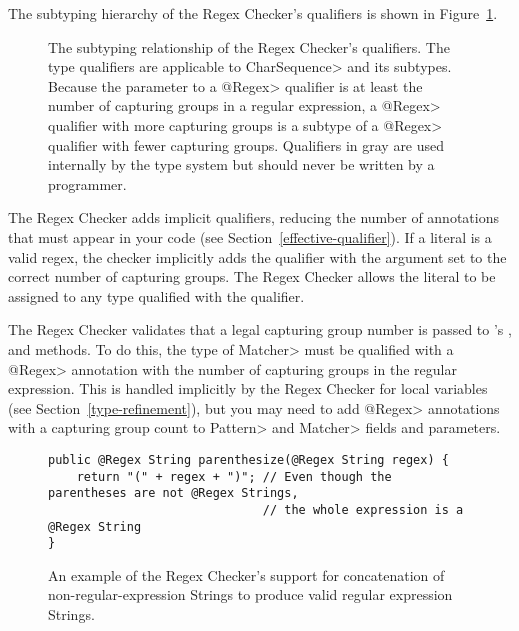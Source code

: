 The subtyping hierarchy of the Regex Checker's qualifiers is shown in
Figure~\ref{fig-regex-hierarchy}.

\begin{figure}
\caption{The subtyping relationship of the Regex Checker's qualifiers.
  The type qualifiers are applicable to \<CharSequence> and its subtypes.
  Because the parameter to a \<@Regex> qualifier is at least the number of
  capturing groups in a regular expression, a \<@Regex> qualifier with more
  capturing groups is a subtype of a \<@Regex> qualifier with fewer capturing
  groups. Qualifiers in gray are used internally by the type
  system but should never be written by a programmer.}
\label{fig-regex-hierarchy}
\end{figure}




The Regex Checker adds
implicit qualifiers, reducing the number of annotations that must appear
in your code (see Section~\ref{effective-qualifier}).
If a  literal is a valid regex,
the checker implicitly adds the  qualifier with
the argument set to the correct number of capturing groups.
The Regex Checker allows
the  literal to be assigned to any type qualified with the
 qualifier.



The Regex Checker validates that a legal capturing group number is passed
to 's
,
 and
 methods. To do this,
the type of \<Matcher> must be qualified with a \<@Regex> annotation
with the number of capturing groups in the regular expression. This is
handled implicitly by the Regex Checker for local variables (see
Section~\ref{type-refinement}), but you may need to add \<@Regex> annotations
with a capturing group count to \<Pattern> and \<Matcher> fields and
parameters.



\begin{figure}
\begin{Verbatim}
public @Regex String parenthesize(@Regex String regex) {
    return "(" + regex + ")"; // Even though the parentheses are not @Regex Strings,
                              // the whole expression is a @Regex String
}
\end{Verbatim}
\caption{An example of the Regex Checker's support for concatenation
of non-regular-expression Strings to produce valid regular expression Strings.}
\label{fig-regex-partial}
\end{figure}

